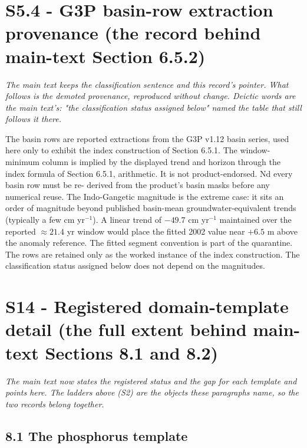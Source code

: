 \documentclass[11pt]{article}
\begin{document}
\section*{S5.4 - G3P basin-row extraction provenance (the record behind main-text Section 6.5.2)}\label{s54---g3p-basin-row-extraction-provenance-the-record-behind-main-text-}

\emph{The main text keeps the classification sentence and this record's pointer. What follows is the demoted provenance, reproduced without change. Deictic words are the main text's: "the classification status assigned below" named the table that still follows it there.}

The basin rows are reported extractions from the G3P v1.12 basin series, used here only to exhibit the index construction of Section 6.5.1. The window-minimum column is implied by the displayed trend and horizon through the index formula of Section 6.5.1, arithmetic. It is not product-endorsed. Nd every basin row must be re- derived from the product's basin masks before any numerical reuse. The Indo-Gangetic magnitude is the extreme case: it sits an order of magnitude beyond published basin-mean groundwater-equivalent trends (typically a few cm yr\(^{-1}\)). A linear trend of \(-49.7\) cm yr\(^{-1}\) maintained over the reported \(\approx 21.4\) yr window would place the fitted 2002 value near \(+6.5\) m above the anomaly reference. The fitted segment convention is part of the quarantine. The rows are retained only as the worked instance of the index construction. The classification status assigned below does not depend on the magnitudes.

\section*{S14 - Registered domain-template detail (the full extent behind main-text Sections 8.1 and 8.2)}\label{s14---registered-domain-template-detail-the-full-extent-behind-main-te}

\emph{The main text now states the registered status and the gap for each template and points here. The ladders above (S2) are the objects these paragraphs name, so the two records belong together.}

\subsection*{8.1 The phosphorus template}\label{81-the-phosphorus-template}
\end{document}
